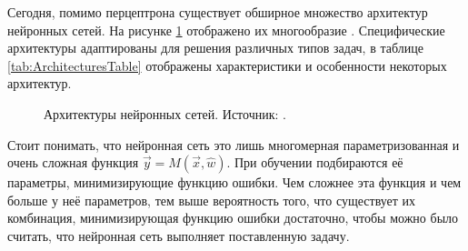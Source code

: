 \par
Сегодня, помимо перцептрона существует обширное множество архитектур нейронных сетей. На рисунке \ref{ris:NNArchitectures} отображено их многообразие \cite{leijnen2020neural}. Специфические архитектуры адаптированы для решения различных типов задач, в таблице \ref{tab:ArchitecturesTable} отображены характеристики и особенности некоторых архитектур.
\begin{figure}[h]
	\caption{Архитектуры нейронных сетей. Источник: \cite{leijnen2020neural}.}
	\label{ris:NNArchitectures}
\end{figure}

\par
Стоит понимать, что нейронная сеть это лишь многомерная параметризованная и очень сложная функция $\vec{y} = M(\vec{x}, \hat{w})$. При обучении подбираются её параметры, минимизирующие функцию ошибки. Чем сложнее эта функция и чем больше у неё параметров, тем выше вероятность того, что существует их комбинация, минимизирующая функцию ошибки достаточно, чтобы можно было считать, что нейронная сеть выполняет поставленную задачу.

